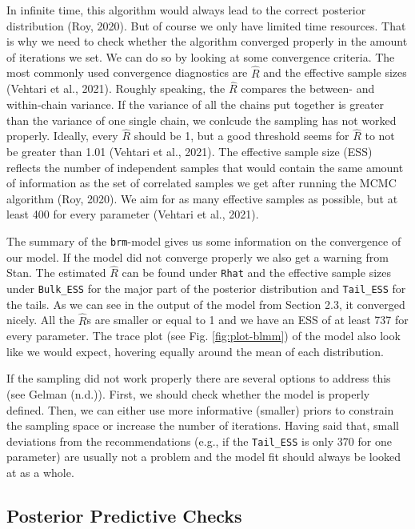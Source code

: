\documentclass[
  doc,12pt,floatsintext]{apa7}
\begin{document}
In infinite time, this algorithm would always lead to the correct posterior distribution (Roy, 2020). But of course we only have limited time resources. That is why we need to check whether the algorithm converged properly in the amount of iterations we set. We can do so by looking at some convergence criteria. The most commonly used convergence diagnostics are \(\hat{R}\) and the effective sample sizes (Vehtari et al., 2021). Roughly speaking, the \(\hat{R}\) compares the between- and within-chain variance. If the variance of all the chains put together is greater than the variance of one single chain, we conlcude the sampling has not worked properly. Ideally, every \(\hat{R}\) should be 1, but a good threshold seems for \(\hat{R}\) to not be greater than 1.01 (Vehtari et al., 2021). The effective sample size (ESS) reflects the number of independent samples that would contain the same amount of information as the set of correlated samples we get after running the MCMC algorithm (Roy, 2020). We aim for as many effective samples as possible, but at least 400 for every parameter (Vehtari et al., 2021).

The summary of the \texttt{brm}-model gives us some information on the convergence of our model. If the model did not converge properly we also get a warning from Stan. The estimated \(\hat{R}\) can be found under \texttt{Rhat} and the effective sample sizes under \texttt{Bulk\_ESS} for the major part of the posterior distribution and \texttt{Tail\_ESS} for the tails. As we can see in the output of the model from Section 2.3, it converged nicely. All the \(\hat{R}\)s are smaller or equal to 1 and we have an ESS of at least 737 for every parameter. The trace plot (see Fig. \ref{fig:plot-blmm}) of the model also look like we would expect, hovering equally around the mean of each distribution.

If the sampling did not work properly there are several options to address this (see Gelman (n.d.)). First, we should check whether the model is properly defined. Then, we can either use more informative (smaller) priors to constrain the sampling space or increase the number of iterations. Having said that, small deviations from the recommendations (e.g., if the \texttt{Tail\_ESS} is only 370 for one parameter) are usually not a problem and the model fit should always be looked at as a whole.

\subsection{Posterior Predictive Checks}\label{posterior-predictive-checks}
\end{document}
